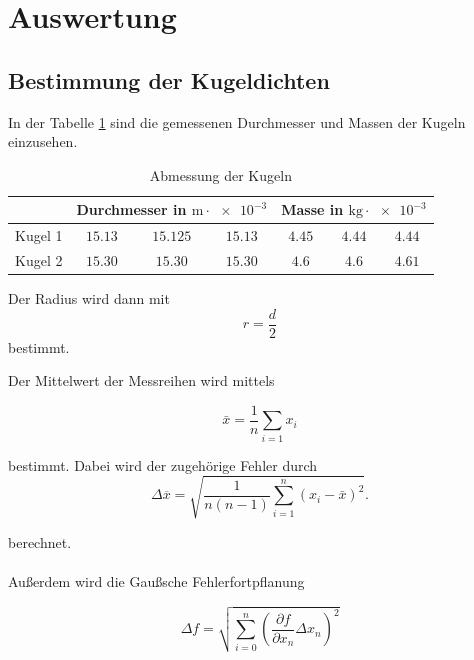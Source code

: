 \section{Auswertung}


\subsection{Bestimmung der Kugeldichten}

In der Tabelle \ref{tab:messwerte_kugel} sind die gemessenen
Durchmesser und Massen der Kugeln einzusehen.

\begin{table}
\centering
\begin{tabular} {ccccccc} %
	\toprule
  & \multicolumn{3}{c}{Durchmesser in $\si{\meter}\cdot \num{e-3}$}  & \multicolumn{3}{c}{Masse in $\si{\kilogram}\cdot \num{e-3}$} \\
\midrule 
Kugel 1 & $\num{15.13} $&  $\num{15.125} $ & $\num{15.13} $  & $\num{4.45}$ & $\num{4.44} $ & $\num{4.44} $ \\
Kugel 2  & $\num{15.30} $&  $\num{15.30} $ & $\num{15.30} $ & $\num{4.6}$ & $\num{4.6} $ & $\num{4.61} $ \\
\bottomrule
\end{tabular}
\caption{Abmessung der Kugeln}
\label{tab:messwerte_kugel}
\end{table}

Der Radius wird dann mit
\begin{equation*}
r=\frac{d}{2}
\end{equation*}
bestimmt.

Der Mittelwert der Messreihen wird mittels

\begin{equation}
\label{eq:mittel}
\bar{x}=\frac{1}{n}\sum_{i=1}x_i
\end{equation}

bestimmt. Dabei wird der zugehörige Fehler
durch
\begin{equation}
\label{eq:stand_ab}
\Delta \overline{x}=\sqrt{\frac{1}{n(n-1)}\sum_{i=1}^{n}(x_i-\bar{x})^2}.
\end{equation}

berechnet. \\\\
Außerdem wird die Gaußsche Fehlerfortpflanung

\begin{equation}
\label{eq:gauss}
\Delta f=\sqrt{\sum_{i=0}^n\left(\frac{\partial f}{\partial x_n} \Delta x_n\right)^2}
\end{equation}

